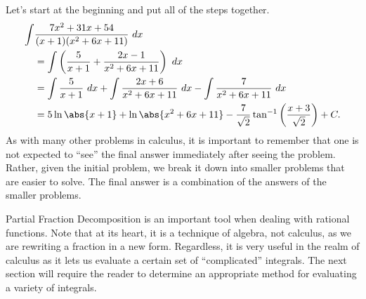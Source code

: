 \begin{example}
Let's start at the beginning and put all of the steps together.
\begin{align*}
	\int&\frac{7x^2+31x+54}{(x+1)(x^2+6x+11)}\ dx \\
	&= \int\left(\frac{5}{x+1} + \frac{2x-1}{x^2+6x+11}\right)\ dx \\
	&= \int\frac{5}{x+1}\ dx  + \int\frac{2x+6}{x^2+6x+11}\ dx -\int\frac{7}{x^2+6x+11}\ dx \\
	&= 5\ln\abs{x+1}+\ln\abs{x^2+6x+11}-\frac7{\sqrt2}\tan^{-1}\left(\frac{x+3}{\sqrt2}\right)+C.
\end{align*}
As with many other problems in calculus, it is important to remember that one is not expected to ``see'' the final answer immediately after seeing the problem. Rather, given the initial problem, we break it down into smaller problems that are easier to solve. The final answer is a combination of the answers of the smaller problems.
\end{example}

Partial Fraction Decomposition is an important tool when dealing with rational functions. Note that at its heart, it is a technique of algebra, not calculus, as we are rewriting a fraction in a new form. Regardless, it is very useful in the realm of calculus as it lets us evaluate a certain set of ``complicated'' integrals.  The next section will require the reader to determine an appropriate method for evaluating a variety of integrals.

